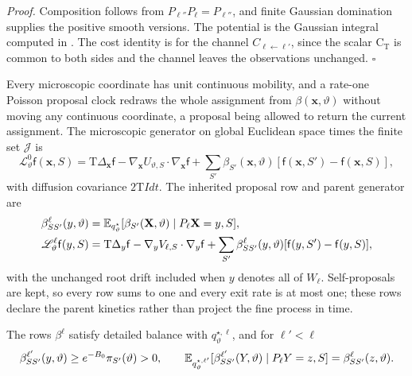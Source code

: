\noindent\emph{Proof.}
Composition follows from \(P_{\ell''}P_\ell=P_{\ell''}\), and finite Gaussian
domination supplies the positive smooth versions. The potential is the
Gaussian integral computed in . The cost
identity is  for the channel
\(C_{\ell\leftarrow\ell'}\), since the scalar \(\mathrm C_{\mathrm T}\) is
common to both sides and the channel leaves the observations unchanged.
\(\square\)

Every microscopic coordinate has unit continuous mobility, and a rate-one
Poisson proposal clock redraws the whole assignment from
\(\beta(\mathbf x,\vartheta)\) without moving any continuous coordinate, a
proposal being allowed to return the current assignment. The microscopic
generator on global Euclidean space times the finite set \(\mathcal J\) is
\begin{equation}
\mathscr L_\vartheta^0\mathsf f(\mathbf x,S)
=\mathrm T\Delta_{\mathbf x}\mathsf f-\nabla_{\mathbf x}U_{\vartheta,S}\cdot\nabla_{\mathbf x}\mathsf f
 +\sum_{S'}\beta_{S'}(\mathbf x,\vartheta)[\mathsf f(\mathbf x,S')-\mathsf f(\mathbf x,S)],
\label{eq:rg-formation-microscopic-generator}
\end{equation}
with diffusion covariance \(2\mathrm TI dt\). The inherited proposal row and
parent generator are
\begin{equation}
\begin{aligned}
\beta^\ell_{SS'}(y,\vartheta)
 &=\mathbb E_{q^\star_\vartheta}
     [\beta_{S'}(\mathbf X,\vartheta)\mid P_\ell\mathbf X=y,S],\\
\mathscr L_\vartheta^\ell\mathsf f(y,S)
 &=\mathrm T\Delta_y\mathsf f-\nabla_yV_{\ell,S}\cdot\nabla_y\mathsf f
   +\sum_{S'}\beta^\ell_{SS'}(y,\vartheta)[\mathsf f(y,S')-\mathsf f(y,S)],
\end{aligned}
\label{eq:rg-formation-parent-generator}
\end{equation}
with the unchanged root drift included when \(y\) denotes all of \(W_\ell\).
Self-proposals are kept, so every row sums to one and every exit rate is at
most one; these rows declare the parent kinetics rather than project the fine
process in time.

The rows \(\beta^\ell\) satisfy detailed balance with \(q^{\star,\ell}_\vartheta\),
and for \(\ell'<\ell\)
\begin{equation}
\beta^{\ell'}_{SS'}(y,\vartheta)\ge e^{-B_0}\pi_{S'}(\vartheta)>0,
\qquad
\mathbb E_{q^{\star,\ell'}_\vartheta}
 [\beta^{\ell'}_{SS'}(Y,\vartheta)\mid P_\ell Y=z,S]
 =\beta^\ell_{SS'}(z,\vartheta).
\label{eq:rg-formation-rate-composition}
\end{equation}

